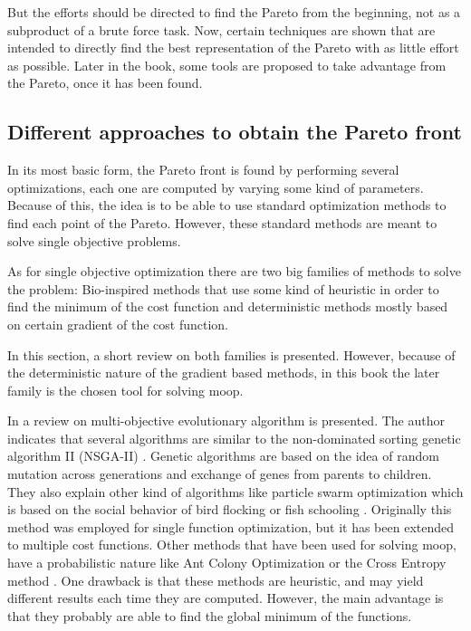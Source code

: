 But the efforts should be directed to find the Pareto from the beginning, not as a subproduct of a brute force task. Now, certain techniques are shown that are intended to directly find the best representation of the Pareto with as little effort as possible. Later in the book, some tools are proposed to take advantage from the Pareto, once it has been found.

\subsection{Different approaches to obtain the Pareto front}
\label{sec:ParetoApproach}
In its most basic form, the Pareto front is found by performing several optimizations, each one are computed by varying some kind of parameters. Because of this, the idea is to be able to use standard optimization methods to find each point of the Pareto. However, these standard methods are meant to solve single objective problems.

As for single objective optimization there are two big families of methods to solve the problem: Bio-inspired methods that use some kind of heuristic in order to find the minimum of the cost function and deterministic methods mostly based on certain gradient of the cost function.

In this section, a short review on both families is presented. However, because of the deterministic nature of the gradient based methods, in this book the later family is the chosen tool for solving \gls{moop}.

In \citet{Zhou2011} a review on multi-objective evolutionary algorithm is presented. The author indicates that several algorithms are similar to the non-dominated sorting genetic algorithm II (NSGA-II) \citep{Deb2002}. Genetic algorithms are based on the idea of random mutation across generations and exchange of genes from parents to children. They also explain other kind of algorithms like particle swarm optimization which is based on the social behavior of bird flocking or fish schooling \citep{Eberhart1995}. Originally this method was employed for single function optimization, but it has been extended to multiple cost functions. Other methods that have been used for solving \gls{moop}, have a probabilistic nature like Ant Colony Optimization \citep{Dorigo2005} or the Cross Entropy method \citep{Rubinstein2004}. One drawback is that these methods are heuristic, and may yield different results each time they are computed. However, the main advantage is that they probably are able to find the global minimum of the functions.

